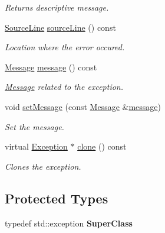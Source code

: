 \begin{DoxyCompactItemize}
\begin{DoxyCompactList}\small\item\em Returns descriptive message. \end{DoxyCompactList}\item 
\hypertarget{class_exception_a67f40ff3ea7f1c07e46222c38dcbaf43}{\hyperlink{class_source_line}{Source\-Line} \hyperlink{class_exception_a67f40ff3ea7f1c07e46222c38dcbaf43}{source\-Line} () const }\label{class_exception_a67f40ff3ea7f1c07e46222c38dcbaf43}

\begin{DoxyCompactList}\small\item\em Location where the error occured. \end{DoxyCompactList}\item 
\hypertarget{class_exception_aab5c1504a18016fdfe7574eb81f59ac6}{\hyperlink{class_message}{Message} \hyperlink{class_exception_aab5c1504a18016fdfe7574eb81f59ac6}{message} () const }\label{class_exception_aab5c1504a18016fdfe7574eb81f59ac6}

\begin{DoxyCompactList}\small\item\em \hyperlink{class_message}{Message} related to the exception. \end{DoxyCompactList}\item 
\hypertarget{class_exception_ad508783fa44767e8fedb6472a4180234}{void \hyperlink{class_exception_ad508783fa44767e8fedb6472a4180234}{set\-Message} (const \hyperlink{class_message}{Message} \&\hyperlink{class_exception_aab5c1504a18016fdfe7574eb81f59ac6}{message})}\label{class_exception_ad508783fa44767e8fedb6472a4180234}

\begin{DoxyCompactList}\small\item\em Set the message. \end{DoxyCompactList}\item 
\hypertarget{class_exception_ad05463060510ad131ccaaafa6b63b2d7}{virtual \hyperlink{class_exception}{Exception} $\ast$ \hyperlink{class_exception_ad05463060510ad131ccaaafa6b63b2d7}{clone} () const }\label{class_exception_ad05463060510ad131ccaaafa6b63b2d7}

\begin{DoxyCompactList}\small\item\em Clones the exception. \end{DoxyCompactList}\end{DoxyCompactItemize}
\subsection*{Protected Types}
\begin{DoxyCompactItemize}
\item 
\hypertarget{class_exception_a5086086062a7ec2cfe4e609026adfbd9}{typedef std\-::exception {\bfseries Super\-Class}}\label{class_exception_a5086086062a7ec2cfe4e609026adfbd9}

\end{DoxyCompactItemize}
